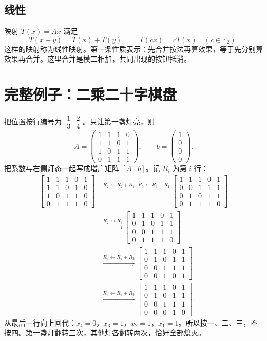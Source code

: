 \documentclass[UTF8,fontset=fandol,11pt,a4paper]{ctexart}
\newcommand{\F}{\mathbb F_2}
\begin{document}
\subsection{线性}
映射 $T(x)=Ax$ 满足
\[
 T(x+y)=T(x)+T(y),\qquad T(cx)=cT(x)\quad(c\in\F).
\]
这样的映射称为线性映射。第一条性质表示：先合并按法再算效果，等于先分别算效果再合并。这里合并是模二相加，共同出现的按钮抵消。
\section{完整例子：二乘二十字棋盘}
把位置按行编号为 $\begin{smallmatrix}1&2\\3&4\end{smallmatrix}$。只让第一盏灯亮，则
\[
 A=\begin{pmatrix}1&1&1&0\\1&1&0&1\\1&0&1&1\\0&1&1&1\end{pmatrix},\qquad
 b=\begin{pmatrix}1\\0\\0\\0\end{pmatrix}.
\]
把系数与右侧灯态一起写成增广矩阵 $[A\mid b]$。记 $R_i$ 为第 $i$ 行：
\begin{align*}
\left[\begin{array}{cccc|c}1&1&1&0&1\\1&1&0&1&0\\1&0&1&1&0\\0&1&1&1&0\end{array}\right]
&\xrightarrow{R_2\gets R_2+R_1,\ R_3\gets R_3+R_1}
\left[\begin{array}{cccc|c}1&1&1&0&1\\0&0&1&1&1\\0&1&0&1&1\\0&1&1&1&0\end{array}\right]\\
&\xrightarrow{R_2\leftrightarrow R_3}
\left[\begin{array}{cccc|c}1&1&1&0&1\\0&1&0&1&1\\0&0&1&1&1\\0&1&1&1&0\end{array}\right]\\
&\xrightarrow{R_4\gets R_4+R_2}
\left[\begin{array}{cccc|c}1&1&1&0&1\\0&1&0&1&1\\0&0&1&1&1\\0&0&1&0&1\end{array}\right]\\
&\xrightarrow{R_4\gets R_4+R_3}
\left[\begin{array}{cccc|c}1&1&1&0&1\\0&1&0&1&1\\0&0&1&1&1\\0&0&0&1&0\end{array}\right].
\end{align*}
从最后一行向上回代：$x_4=0$，$x_3=1$，$x_2=1$，$x_1=1$。所以按一、二、三，不按四。第一盏灯翻转三次，其他灯各翻转两次，恰好全部熄灭。
\end{document}
